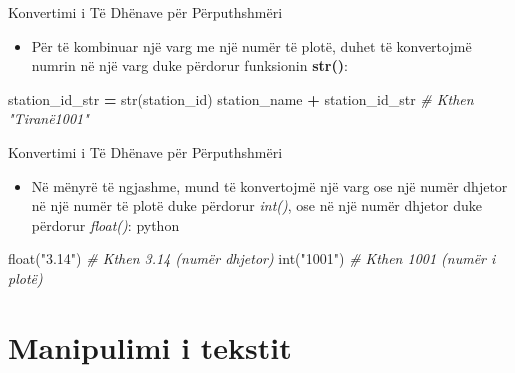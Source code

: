 \documentclass[
  ignorenonframetext,
]{beamer}
\newenvironment{Shaded}{\begin{snugshade}}{\end{snugshade}}
\newcommand{\BuiltInTok}[1]{#1}
\newcommand{\CommentTok}[1]{\textcolor[rgb]{0.56,0.35,0.01}{\textit{#1}}}
\newcommand{\NormalTok}[1]{#1}
\newcommand{\OperatorTok}[1]{\textcolor[rgb]{0.81,0.36,0.00}{\textbf{#1}}}
\newcommand{\StringTok}[1]{\textcolor[rgb]{0.31,0.60,0.02}{#1}}
\providecommand{\tightlist}{%
  \setlength{\itemsep}{0pt}\setlength{\parskip}{0pt}}
\begin{document}
\begin{frame}[fragile]{Konvertimi i Të Dhënave për Përputhshmëri}
\protect\hypertarget{konvertimi-i-tuxeb-dhuxebnave-puxebr-puxebrputhshmuxebri}{}
\begin{itemize}
\tightlist
\item
  Për të kombinuar një varg me një numër të plotë, duhet të konvertojmë
  numrin në një varg duke përdorur funksionin \textbf{str()}:
\end{itemize}

\begin{Shaded}
\begin{Highlighting}[]
\NormalTok{station\_id\_str }\OperatorTok{=} \BuiltInTok{str}\NormalTok{(station\_id)}
\NormalTok{station\_name }\OperatorTok{+}\NormalTok{ station\_id\_str  }\CommentTok{\# Kthen "Tiranë1001"}
\end{Highlighting}
\end{Shaded}
\end{frame}

\begin{frame}[fragile]{Konvertimi i Të Dhënave për Përputhshmëri}
\protect\hypertarget{konvertimi-i-tuxeb-dhuxebnave-puxebr-puxebrputhshmuxebri-1}{}
\begin{itemize}
\tightlist
\item
  Në mënyrë të ngjashme, mund të konvertojmë një varg ose një numër
  dhjetor në një numër të plotë duke përdorur \emph{int()}, ose në një
  numër dhjetor duke përdorur \emph{float()}: python
\end{itemize}

\begin{Shaded}
\begin{Highlighting}[]
\BuiltInTok{float}\NormalTok{(}\StringTok{"3.14"}\NormalTok{)  }\CommentTok{\# Kthen 3.14 (numër dhjetor)}
\BuiltInTok{int}\NormalTok{(}\StringTok{"1001"}\NormalTok{)  }\CommentTok{\# Kthen 1001 (numër i plotë)}
\end{Highlighting}
\end{Shaded}
\end{frame}

\hypertarget{manipulimi-i-tekstit}{%
\section*{Manipulimi i tekstit}\label{manipulimi-i-tekstit}}
\end{document}
